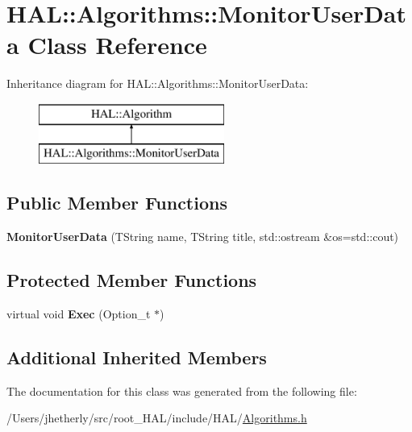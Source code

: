 \hypertarget{class_h_a_l_1_1_algorithms_1_1_monitor_user_data}{\section{H\+A\+L\+:\+:Algorithms\+:\+:Monitor\+User\+Data Class Reference}
\label{class_h_a_l_1_1_algorithms_1_1_monitor_user_data}
}
Inheritance diagram for H\+A\+L\+:\+:Algorithms\+:\+:Monitor\+User\+Data\+:\begin{figure}[H]
\begin{center}
\leavevmode
\includegraphics[height=2.000000cm]{class_h_a_l_1_1_algorithms_1_1_monitor_user_data}
\end{center}
\end{figure}
\subsection*{Public Member Functions}
\begin{DoxyCompactItemize}
\item 
\hypertarget{class_h_a_l_1_1_algorithms_1_1_monitor_user_data_acd4eeebf53037457c4b0e2095934a723}{{\bfseries Monitor\+User\+Data} (T\+String name, T\+String title, std\+::ostream \&os=std\+::cout)}\label{class_h_a_l_1_1_algorithms_1_1_monitor_user_data_acd4eeebf53037457c4b0e2095934a723}

\end{DoxyCompactItemize}
\subsection*{Protected Member Functions}
\begin{DoxyCompactItemize}
\item 
\hypertarget{class_h_a_l_1_1_algorithms_1_1_monitor_user_data_aea4229dea8ffbd7edfa8a4108e72205c}{virtual void {\bfseries Exec} (Option\+\_\+t $\ast$)}\label{class_h_a_l_1_1_algorithms_1_1_monitor_user_data_aea4229dea8ffbd7edfa8a4108e72205c}

\end{DoxyCompactItemize}
\subsection*{Additional Inherited Members}


The documentation for this class was generated from the following file\+:\begin{DoxyCompactItemize}
\item 
/\+Users/jhetherly/src/root\+\_\+\+H\+A\+L/include/\+H\+A\+L/\hyperlink{_algorithms_8h}{Algorithms.\+h}\end{DoxyCompactItemize}
